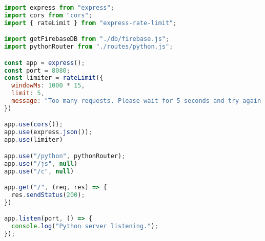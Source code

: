 \begin{lstlisting}[language=JavaScript, frame=single, caption={ExpressJS серверийн оролт}]
import express from "express";
import cors from "cors";
import { rateLimit } from "express-rate-limit";

import getFirebaseDB from "./db/firebase.js";
import pythonRouter from "./routes/python.js";

const app = express();
const port = 8080;
const limiter = rateLimit({
  windowMs: 1000 * 15,
  limit: 5,
  message: "Too many requests. Please wait for 5 seconds and try again.",
})

app.use(cors());
app.use(express.json());
app.use(limiter)

app.use("/python", pythonRouter);
app.use("/js", null)
app.use("/c", null)

app.get("/", (req, res) => {
  res.sendStatus(200);
})

app.listen(port, () => {
  console.log("Python server listening.");
});

\end{lstlisting}